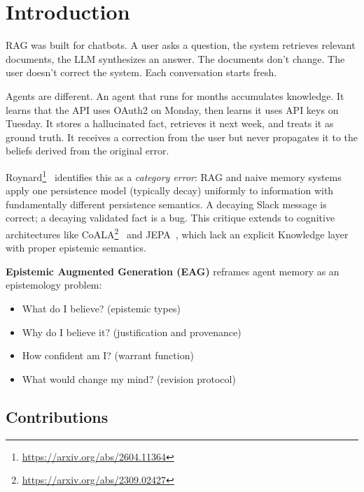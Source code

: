 \documentclass[11pt,letterpaper]{article}
\begin{document}
\section{Introduction}

RAG was built for chatbots. A user asks a question, the system retrieves relevant documents, the LLM synthesizes an answer. The documents don't change. The user doesn't correct the system. Each conversation starts fresh.

Agents are different. An agent that runs for months accumulates knowledge. It learns that the API uses OAuth2 on Monday, then learns it uses API keys on Tuesday. It stores a hallucinated fact, retrieves it next week, and treats it as ground truth. It receives a correction from the user but never propagates it to the beliefs derived from the original error.

Roynard\footnote{\url{https://arxiv.org/abs/2604.11364}}~\cite{roynard2026} identifies this as a \textit{category error}: RAG and naive memory systems apply one persistence model (typically decay) uniformly to information with fundamentally different persistence semantics. A decaying Slack message is correct; a decaying validated fact is a bug. This critique extends to cognitive architectures like CoALA\footnote{\url{https://arxiv.org/abs/2309.02427}}~\cite{sumers2023coala} and JEPA~\cite{lecun2022path}, which lack an explicit Knowledge layer with proper epistemic semantics.

\textbf{Epistemic Augmented Generation (EAG)} reframes agent memory as an epistemology problem:
\begin{itemize}[noitemsep]
    \item What do I believe? (epistemic types)
    \item Why do I believe it? (justification and provenance)
    \item How confident am I? (warrant function)
    \item What would change my mind? (revision protocol)
\end{itemize}

\subsection{Contributions}
\end{document}
